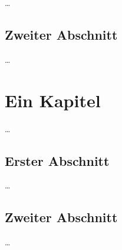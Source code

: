 \dots


\section{Zweiter Abschnitt}
\label{ch:Content1:sec:Section2}

\dots



\chapter{Ein Kapitel}
\label{ch:Content2}

\dots


\section{Erster Abschnitt}
\label{ch:Content2:sec:Section1}

\dots


\section{Zweiter Abschnitt}
\label{ch:Content2:sec:Section2}

\dots
